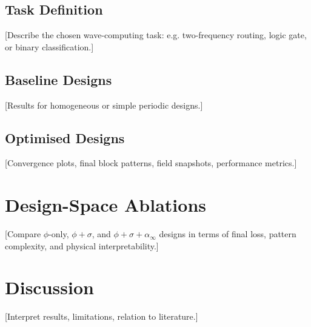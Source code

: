 
\subsection{Task Definition}
[Describe the chosen wave-computing task: e.g. two-frequency routing, logic gate, or binary classification.]

\subsection{Baseline Designs}
[Results for homogeneous or simple periodic designs.]

\subsection{Optimised Designs}
[Convergence plots, final block patterns, field snapshots, performance metrics.]

\section{Design-Space Ablations}
\label{sec:ablations}


[Compare $\phi$-only, $\phi+\sigma$, and $\phi+\sigma+\alpha_\infty$ designs in terms of final loss, pattern complexity, and physical interpretability.]

\section{Discussion}
\label{sec:discussion}


[Interpret results, limitations, relation to literature.]
